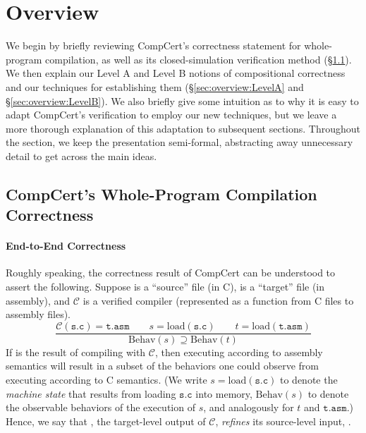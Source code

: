 \section{Overview}
\label{sec:sepcomp:overview}

We begin by briefly reviewing CompCert's correctness statement for
whole-program compilation, as well as its closed-simulation verification
method (\S\ref{sec:overview:compcert}).  We then explain our Level A
and Level B notions of compositional correctness and our techniques
for establishing them (\S\ref{sec:overview:LevelA} and
\S\ref{sec:overview:LevelB}).  We also briefly give some intuition as
to why it is easy to adapt CompCert's verification to employ our new
techniques, but we leave a more thorough explanation of this
adaptation to subsequent sections.  Throughout the section, we keep
the presentation semi-formal, abstracting away unnecessary detail to
get across the main ideas.

\subsection{CompCert's Whole-Program Compilation Correctness}
\label{sec:overview:compcert}

\paragraph{End-to-End Correctness}

Roughly speaking, the correctness result of CompCert can be understood
to assert the following.  Suppose  is a ``source'' file (in
C),  is a ``target'' file (in assembly), and 
$\mathcal{C}$ is a verified compiler (represented as a function from C
files to assembly files).
\[
\frac{
\mathcal{C}(\mathtt{s.c}) = \mathtt{t.asm} \qquad
s = \mathrm{load}(\mathtt{s.c})\qquad
t = \mathrm{load}(\mathtt{t.asm})}
{\mathrm{Behav}(s) \supseteq \mathrm{Behav}(t)}
\]
If  is the result of compiling  with $\mathcal{C}$,
then executing  according to assembly semantics will result
in a subset of the behaviors one could observe from executing 
according to C semantics.  (We write $s = \mathrm{load}(\mathtt{s.c})$
to denote the \emph{machine state} that results from loading
$\mathtt{s.c}$ into memory, $\mathrm{Behav}(s)$ to denote the
observable behaviors of the execution of $s$, and analogously for $t$
and $\mathtt{t.asm}$.)  Hence, we say that , the
target-level output of $\mathcal{C}$, \emph{refines} its source-level
input, .

